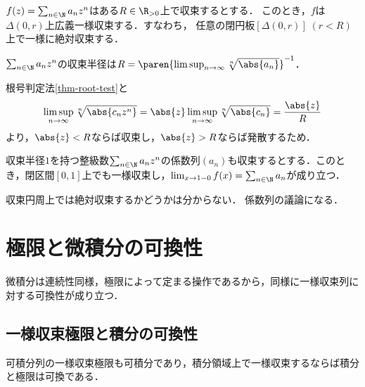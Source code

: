 \documentclass[uplatex, dvipdfmx]{jsreport}
\begin{document}
\begin{theorem}[整級数には収束半径が定まる]
    $f(z)=\sum_{n\in\N}a_nz^n$はある$R\in\R_{>0}$上で収束するとする．
    このとき，$f$は$\Delta(0,r)$上広義一様収束する．すなわち，
    任意の閉円板$[\Delta(0,r)]\;(r<R)$上で一様に絶対収束する．
\end{theorem}

\begin{theorem}
    $\sum_{n\in\N}a_nz^n$の収束半径は$R=\paren{\limsup_{n\to\infty}\sqrt[n]{\abs{a_n}}}^{-1}$．
\end{theorem}
\begin{Proof}
    根号判定法\ref{thm-root-test}と
    \[\limsup_{n\to\infty}\sqrt[n]{\abs{c_nz^n}}=\abs{z}\limsup_{n\to\infty}\sqrt[n]{\abs{c_n}}=\frac{\abs{z}}{R}\]
    より，$\abs{z}<R$ならば収束し，$\abs{z}>R$ならば発散するため．
\end{Proof}

\begin{theorem}
    収束半径$1$を持つ整級数$\sum_{n\in\N}a_nz^n$の係数列$(a_n)$も収束するとする．このとき，閉区間$[0,1]$上でも一様収束し，$\lim_{x\to 1-0}f(x)=\sum_{n\in\N}a_n$が成り立つ．
\end{theorem}
\begin{remarks}
    収束円周上では絶対収束するかどうかは分からない．
    係数列の議論になる．
\end{remarks}

\section{極限と微積分の可換性}

\begin{tcolorbox}[colframe=ForestGreen, colback=ForestGreen!10!white,breakable,colbacktitle=ForestGreen!40!white,coltitle=black,fonttitle=\bfseries\sffamily,
title=]
    微積分は連続性同様，極限によって定まる操作であるから，同様に一様収束列に対する可換性が成り立つ．
\end{tcolorbox}

\subsection{一様収束極限と積分の可換性}

\begin{tcolorbox}[colframe=ForestGreen, colback=ForestGreen!10!white,breakable,colbacktitle=ForestGreen!40!white,coltitle=black,fonttitle=\bfseries\sffamily,
title=]
    可積分列の一様収束極限も可積分であり，積分領域上で一様収束するならば積分と極限は可換である．
\end{tcolorbox}
\end{document}
